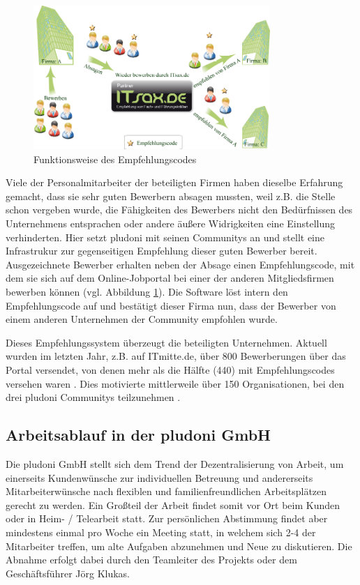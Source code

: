 \begin{figure}[htbp]
 \centering
 \includegraphics[width=0.8\textwidth]{./material/empfehlungscode.png}
 \caption{Funktionsweise des Empfehlungscodes}
 \label{fig:empfehlung}
\end{figure}
Viele der Personalmitarbeiter der beteiligten Firmen haben dieselbe Erfahrung gemacht, dass sie sehr guten Bewerbern absagen mussten, weil z.B. die Stelle schon vergeben wurde, die Fähigkeiten des Bewerbers nicht den Bedürfnissen des Unternehmens entsprachen oder andere äußere Widrigkeiten eine Einstellung verhinderten. Hier setzt pludoni mit seinen Communitys an und stellt eine Infrastrukur zur gegenseitigen Empfehlung dieser guten Bewerber bereit.  Ausgezeichnete Bewerber erhalten neben der Absage einen Empfehlungscode, mit dem sie sich auf dem Online-Jobportal bei einer der anderen Mitgliedsfirmen bewerben können (vgl. Abbildung \ref{fig:empfehlung}). Die Software löst intern den Empfehlungscode auf und bestätigt dieser Firma nun, dass der Bewerber von einem anderen Unternehmen der Community empfohlen wurde.

Dieses Empfehlungssystem überzeugt die beteiligten Unternehmen. Aktuell wurden im letzten Jahr, z.B. auf ITmitte.de, über 800 Bewerberungen über das Portal versendet, von denen mehr als die Hälfte (440) mit Empfehlungscodes versehen waren \citep{joerg_klukas_startseite_2011}. Dies motivierte mittlerweile über 150 Organisationen, bei den drei pludoni Communitys teilzunehmen \citep{joerg_klukas_referenzen_2011}.

\subsection{Arbeitsablauf in der pludoni GmbH}
\label{sec:arbeitsablauf}
Die pludoni GmbH stellt sich dem Trend der Dezentralisierung von Arbeit, um einerseits Kundenwünsche zur individuellen Betreuung und andererseits Mitarbeiterwünsche nach flexiblen und familienfreundlichen Arbeitsplätzen gerecht zu werden. Ein Großteil der Arbeit findet somit vor Ort beim Kunden oder in Heim- / Telearbeit statt.
Zur persönlichen Abstimmung findet aber mindestens einmal pro Woche ein Meeting statt, in welchem sich 2-4 der Mitarbeiter treffen, um alte Aufgaben abzunehmen und Neue zu diskutieren. Die Abnahme erfolgt dabei durch den Teamleiter des Projekts oder dem Geschäftsführer Jörg Klukas.

